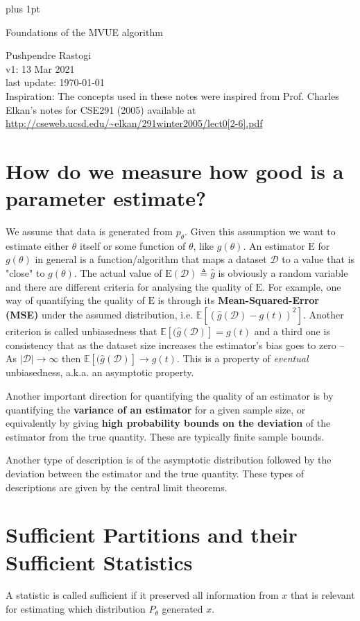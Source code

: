 \documentclass[preview,border={30 30 30 30}]{standalone}
\newcommand{\ta}{\theta}
\newcommand{\cD}{\mathcal{D}}
\begin{document}
\parskip=5pt plus 1pt
\begin{center}
    \Large Foundations of the MVUE algorithm
\end{center}
Pushpendre Rastogi\\
v1: 13 Mar 2021\\
last update: \today\\
Inspiration: The concepts used in these notes were inspired from Prof. Charles Elkan's notes for CSE291 (2005) available at \url{http://cseweb.ucsd.edu/~elkan/291winter2005/lect0[2-6].pdf}
\section{How do we measure how good is a parameter estimate?}
We assume that data is generated from $p_\ta$. Given this assumption we want to estimate either $\ta$ itself or some function of $\ta$, like $g(\ta)$. An estimator $\mathrm{E}$ for $g(\ta)$ in general is a function/algorithm that maps a dataset $\cD$ to a value that is "close" to $g(\ta)$. The actual value of $\mathrm{E}(\cD) \triangleq \hat{g}$ is obviously a random variable and there are different criteria for analysing the quality of $\mathrm{E}$. For example, one way of quantifying the quality of $\mathrm{E}$ is through its \textbf{Mean-Squared-Error (MSE)} under the assumed distribution, i.e. $\mathbb{E}[(\hat{g}(\cD) - g(t))^2]$. Another criterion is called unbiasedness that $\mathbb{E}[(\hat{g}(\cD)] = g(t)$ and a third one is consistency that as the dataset size increases the estimator's bias goes to zero -- As $|\cD| \rightarrow \infty$ then $\mathbb{E}[(\hat{g}(\cD)] \rightarrow g(t)$. This is a property of \textit{eventual} unbiasedness, a.k.a. an asymptotic property. 

Another important direction for quantifying the quality of an estimator is by quantifying the \textbf{variance of an estimator} for a given sample size, or equivalently by giving \textbf{high probability bounds on the deviation} of the estimator from the true quantity. These are typically finite sample bounds.

Another type of description is of the asymptotic distribution followed by the deviation between the estimator and the true quantity. These types of descriptions are given by the central limit theorems.


\section{Sufficient Partitions and their Sufficient Statistics}
A statistic is called sufficient if it preserved all information from $x$ that is relevant for estimating which distribution $P_\theta$ generated $x$. 
\end{document}
